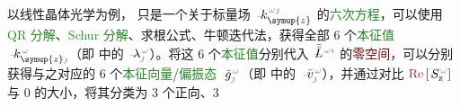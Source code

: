 以线性晶体光学为例， 只是一个关于标量场 $\Xint{\begin{smallmatrix} ~ \\ {}^{}_{\mathcolor{gray}{-}} \\ ~ \end{smallmatrix}}{15}{k}_{\symup{z}}^{\;\! \mathcolor{gray}{\omega} \textcolor{ForestGreen}{\jmath}}$ 的\textcolor{ForestGreen}{六次方程}，可以使用 \textcolor{ForestGreen}{QR 分解}、\textcolor{ForestGreen}{Schur 分解}、求根公式、牛顿迭代法，获得全部 6 个\textcolor{ForestGreen}{本征值} $\Xint{\begin{smallmatrix} ~ \\ {}^{}_{\mathcolor{gray}{-}} \\ ~ \end{smallmatrix}}{15}{k}_{\symup{z} \textcolor{ForestGreen}{\jmath}}^{\;\! \mathcolor{gray}{\omega}}$（即  中的 $\Xint{\begin{smallmatrix} ~ \\ {}^{}_{\mathcolor{gray}{-}} \\ ~ \end{smallmatrix}}{22}{\lambda}^{\;\!\mathcolor{gray}{\omega}}_{\textcolor{ForestGreen}{\jmath}}$）\cite{raabMultipoleTheoryElectromagnetism2004}。将这 6 个\textcolor{ForestGreen}{本征值}分别代入 $\Xint{\mathcolor{gray}{-}}{30}{\bar{\bar{L}}}^{\;\! \mathcolor{gray}{\omega} \textcolor{ForestGreen}{\imath}}$ 的\textcolor{Maroon}{零空间}\cite{changWavePropagationBianisotropic2014,chernChiralSurfaceWaves2017}，可以分别获得与之对应的 6 个\textcolor{ForestGreen}{本征向量}/\textcolor{ForestGreen}{偏振态} $\Xint{{}^{}_{\mathcolor{gray}{-}}}{10}{\bar{g}}^{\;\!\mathcolor{gray}{\omega}}_{\textcolor{ForestGreen}{\jmath}}$（即  中的 $\Xint{\begin{smallmatrix} ~ \\ {}^{}_{\mathcolor{gray}{-}} \\ ~ \end{smallmatrix}}{15}{\bar{v}}^{\;\!\mathcolor{gray}{\omega}}_{\textcolor{ForestGreen}{\jmath}}$），并通过对比 $\textcolor{Maroon}{\text{Re}} \left[ \Xint{\mathcolor{gray}{-}}{25}{S}^{\;\! \mathcolor{gray}{\omega}}_{\mathrm{z}} \right]$ 与 $0$ 的大小，将其分类为 3 个正向、3 